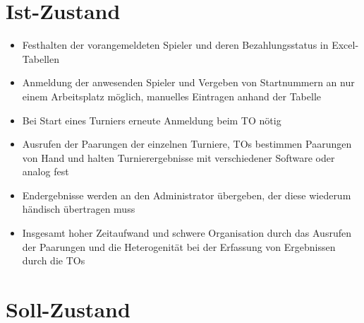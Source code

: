 \documentclass[11pt]{article}
\begin{document}
\section{Ist-Zustand}

\begin{itemize}
	\item Festhalten der vorangemeldeten Spieler und deren Bezahlungsstatus in Excel-Tabellen
	\item Anmeldung der anwesenden Spieler und Vergeben von Startnummern an nur einem Arbeitsplatz möglich, manuelles Eintragen anhand der Tabelle
	\item Bei Start eines Turniers erneute Anmeldung beim TO nötig
	\item Ausrufen der Paarungen der einzelnen Turniere, TOs bestimmen Paarungen von Hand und halten Turnierergebnisse mit verschiedener Software oder analog fest
	\item Endergebnisse werden an den Administrator übergeben, der diese wiederum händisch übertragen muss
	\item Insgesamt hoher Zeitaufwand und schwere Organisation durch das Ausrufen der Paarungen und die Heterogenität bei der Erfassung von Ergebnissen durch die TOs
\end{itemize}

\newpage
\section{Soll-Zustand}
\end{document}
